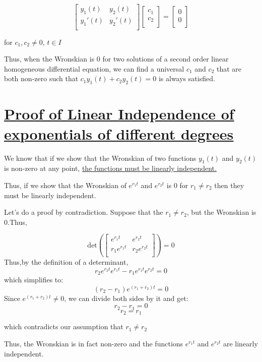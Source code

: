 \documentclass{report}
\begin{document}
{$$
\begin{bmatrix}
    y_1(t) & y_2(t) \\
    y_1'(t) & y_2'(t) \\
\end{bmatrix}
\begin{bmatrix}
    c_1 \\
    c_2 \\
\end{bmatrix}
=
\begin{bmatrix}
    0 \\
    0 \\
\end{bmatrix}
$$

for $c_1, c_2 \neq 0$, $t \in I$

Thus, when the Wronskian is 0 for two solutions of a second order linear homogeneous differential equation, we can find a universal $c_1$ and $c_2$ that are both non-zero such that $c_1y_1(t) +c_2y_2(t) = 0$ is always satisfied. 


\section{\hyperref[th:expLinInd]{Proof of Linear Independence of exponentials of different degrees}}
\label{sec:prExpLinInd}
We know that  if we show that the Wronskian of two functions $y_1(t)$ and $y_2(t)$ is non-zero at any point, \hyperref[th:wronLinInd]{the functions must be linearly independent.}

Thus, if we show that the Wronskian of $e^{r_1t}$ and $e^{r_2t}$ is 0 for $r_1 \neq r_2$ then they must be linearly independent.

Let's do a proof by contradiction. Suppose that the $r_1 \neq r_2$, but the Wronskian is 0.Thus,

$$
    \text{det}\left(\begin{bmatrix}
        e^{r_1t} & e^{r_2t} \\
        r_1 e^{r_1t} & r_2 e^{r_2t} \\
    \end{bmatrix}\right)
    = 0
$$
Thus,by the definition of a determinant,
$$r_2e^{r_2t}e^{r_1t} -r_1e^{r_1t}e^{r_2t} = 0$$
which simplifies to:
$$(r_2-r_1)e^{(r_1+r_2)t} = 0$$
Since $e^{(r_1+r_2)t} \neq 0$, we can divide both sides by it and get:
$$r_2 -r_1 = 0$$
$$r_2 = r_1$$

which contradicts our assumption that $r_1 \neq r_2$

Thus, the Wronskian is in fact non-zero and the functions $e^{r_1t}$ and $e^{r_2t}$ are linearly independent.

}
\end{document}
